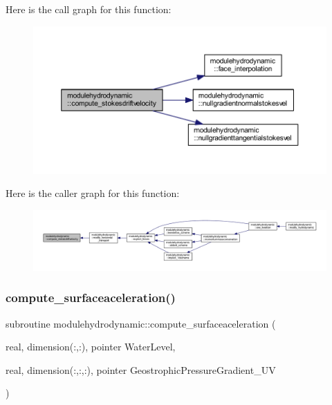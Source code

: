 Here is the call graph for this function\+:\nopagebreak
\begin{figure}[H]
\begin{center}
\leavevmode
\includegraphics[width=350pt]{namespacemodulehydrodynamic_aa9d607cb819115ecbd2eaade1767926c_cgraph}
\end{center}
\end{figure}
Here is the caller graph for this function\+:\nopagebreak
\begin{figure}[H]
\begin{center}
\leavevmode
\includegraphics[width=350pt]{namespacemodulehydrodynamic_aa9d607cb819115ecbd2eaade1767926c_icgraph}
\end{center}
\end{figure}
\mbox{\label{namespacemodulehydrodynamic_a6ed1d015329405f39d5cfdf5e7481273}} 
\subsubsection{\texorpdfstring{compute\+\_\+surfaceaceleration()}{compute\_surfaceaceleration()}}
{\footnotesize\ttfamily subroutine modulehydrodynamic\+::compute\+\_\+surfaceaceleration (\begin{DoxyParamCaption}\item[{real, dimension(\+:,\+:), pointer}]{Water\+Level,  }\item[{real, dimension(\+:,\+:,\+:), pointer}]{Geostrophic\+Pressure\+Gradient\+\_\+\+UV }\end{DoxyParamCaption})\hspace{0.3cm}{\ttfamily [private]}}

